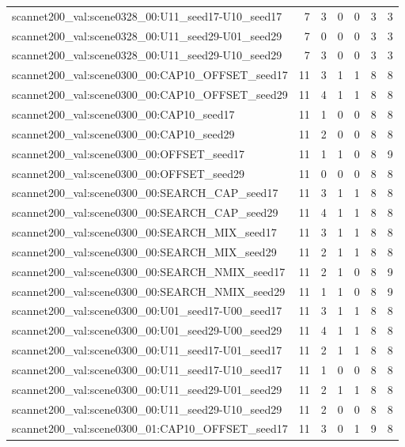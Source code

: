 \begin{table}[t]
\begin{tabular}{lrrrrrr}
scannet200\_val:scene0328\_00:U11\_seed17-U10\_seed17 & 7 & 3 & 0 & 0 & 3 & 3 \\
scannet200\_val:scene0328\_00:U11\_seed29-U01\_seed29 & 7 & 0 & 0 & 0 & 3 & 3 \\
scannet200\_val:scene0328\_00:U11\_seed29-U10\_seed29 & 7 & 3 & 0 & 0 & 3 & 3 \\
scannet200\_val:scene0300\_00:CAP10\_OFFSET\_seed17 & 11 & 3 & 1 & 1 & 8 & 8 \\
scannet200\_val:scene0300\_00:CAP10\_OFFSET\_seed29 & 11 & 4 & 1 & 1 & 8 & 8 \\
scannet200\_val:scene0300\_00:CAP10\_seed17 & 11 & 1 & 0 & 0 & 8 & 8 \\
scannet200\_val:scene0300\_00:CAP10\_seed29 & 11 & 2 & 0 & 0 & 8 & 8 \\
scannet200\_val:scene0300\_00:OFFSET\_seed17 & 11 & 1 & 1 & 0 & 8 & 9 \\
scannet200\_val:scene0300\_00:OFFSET\_seed29 & 11 & 0 & 0 & 0 & 8 & 8 \\
scannet200\_val:scene0300\_00:SEARCH\_CAP\_seed17 & 11 & 3 & 1 & 1 & 8 & 8 \\
scannet200\_val:scene0300\_00:SEARCH\_CAP\_seed29 & 11 & 4 & 1 & 1 & 8 & 8 \\
scannet200\_val:scene0300\_00:SEARCH\_MIX\_seed17 & 11 & 3 & 1 & 1 & 8 & 8 \\
scannet200\_val:scene0300\_00:SEARCH\_MIX\_seed29 & 11 & 2 & 1 & 1 & 8 & 8 \\
scannet200\_val:scene0300\_00:SEARCH\_NMIX\_seed17 & 11 & 2 & 1 & 0 & 8 & 9 \\
scannet200\_val:scene0300\_00:SEARCH\_NMIX\_seed29 & 11 & 1 & 1 & 0 & 8 & 9 \\
scannet200\_val:scene0300\_00:U01\_seed17-U00\_seed17 & 11 & 3 & 1 & 1 & 8 & 8 \\
scannet200\_val:scene0300\_00:U01\_seed29-U00\_seed29 & 11 & 4 & 1 & 1 & 8 & 8 \\
scannet200\_val:scene0300\_00:U11\_seed17-U01\_seed17 & 11 & 2 & 1 & 1 & 8 & 8 \\
scannet200\_val:scene0300\_00:U11\_seed17-U10\_seed17 & 11 & 1 & 0 & 0 & 8 & 8 \\
scannet200\_val:scene0300\_00:U11\_seed29-U01\_seed29 & 11 & 2 & 1 & 1 & 8 & 8 \\
scannet200\_val:scene0300\_00:U11\_seed29-U10\_seed29 & 11 & 2 & 0 & 0 & 8 & 8 \\
scannet200\_val:scene0300\_01:CAP10\_OFFSET\_seed17 & 11 & 3 & 0 & 1 & 9 & 8 \\

\end{tabular}
\end{table}
